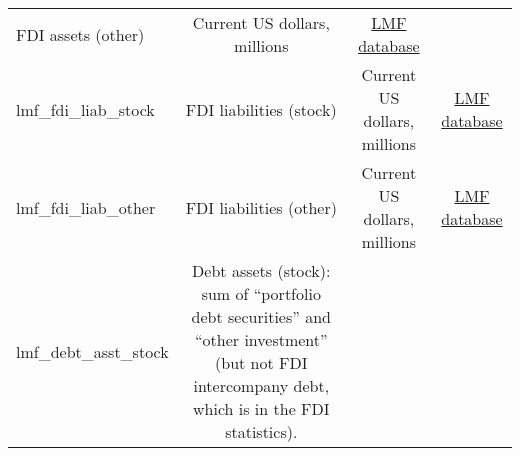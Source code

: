 \documentclass[]{article}
\begin{document}
\begin{longtable}[]{@{}lccc@{}}
\begin{minipage}[t]{0.36\columnwidth}
FDI assets (other)\strut
\end{minipage} & \begin{minipage}[t]{0.24\columnwidth}\centering\strut
Current US dollars, millions\strut
\end{minipage} & \begin{minipage}[t]{0.15\columnwidth}\centering\strut
\href{http://www.philiplane.org/EWN.html}{LMF database}\strut
\end{minipage}\tabularnewline
\begin{minipage}[t]{0.14\columnwidth}\raggedright\strut
lmf\_fdi\_liab\_stock\strut
\end{minipage} & \begin{minipage}[t]{0.36\columnwidth}\centering\strut
FDI liabilities (stock)\strut
\end{minipage} & \begin{minipage}[t]{0.24\columnwidth}\centering\strut
Current US dollars, millions\strut
\end{minipage} & \begin{minipage}[t]{0.15\columnwidth}\centering\strut
\href{http://www.philiplane.org/EWN.html}{LMF database}\strut
\end{minipage}\tabularnewline
\begin{minipage}[t]{0.14\columnwidth}\raggedright\strut
lmf\_fdi\_liab\_other\strut
\end{minipage} & \begin{minipage}[t]{0.36\columnwidth}\centering\strut
FDI liabilities (other)\strut
\end{minipage} & \begin{minipage}[t]{0.24\columnwidth}\centering\strut
Current US dollars, millions\strut
\end{minipage} & \begin{minipage}[t]{0.15\columnwidth}\centering\strut
\href{http://www.philiplane.org/EWN.html}{LMF database}\strut
\end{minipage}\tabularnewline
\begin{minipage}[t]{0.14\columnwidth}\raggedright\strut
lmf\_debt\_asst\_stock\strut
\end{minipage} & \begin{minipage}[t]{0.36\columnwidth}\centering\strut
Debt assets (stock): sum of ``portfolio debt securities'' and ``other
investment'' (but not FDI intercompany debt, which is in the FDI
statistics).\strut
\end{minipage} & \begin{minipage}[t]{0.24\columnwidth}\centering\strut

\end{minipage}
\end{longtable}
\end{document}
